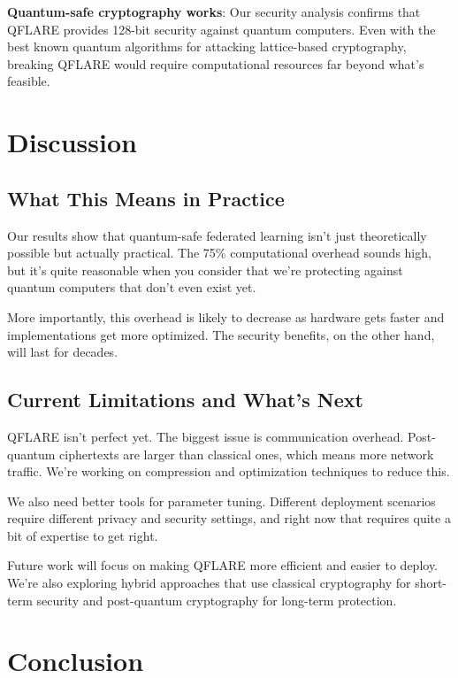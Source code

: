\documentclass[journal]{IEEEtran}
\begin{document}
\textbf{Quantum-safe cryptography works}: Our security analysis confirms that QFLARE provides 128-bit security against quantum computers. Even with the best known quantum algorithms for attacking lattice-based cryptography, breaking QFLARE would require computational resources far beyond what's feasible.

\section{Discussion}

\subsection{What This Means in Practice}

Our results show that quantum-safe federated learning isn't just theoretically possible but actually practical. The 75\% computational overhead sounds high, but it's quite reasonable when you consider that we're protecting against quantum computers that don't even exist yet.

More importantly, this overhead is likely to decrease as hardware gets faster and implementations get more optimized. The security benefits, on the other hand, will last for decades.

\subsection{Current Limitations and What's Next}

QFLARE isn't perfect yet. The biggest issue is communication overhead. Post-quantum ciphertexts are larger than classical ones, which means more network traffic. We're working on compression and optimization techniques to reduce this.

We also need better tools for parameter tuning. Different deployment scenarios require different privacy and security settings, and right now that requires quite a bit of expertise to get right.

Future work will focus on making QFLARE more efficient and easier to deploy. We're also exploring hybrid approaches that use classical cryptography for short-term security and post-quantum cryptography for long-term protection.

\section{Conclusion}
\end{document}
